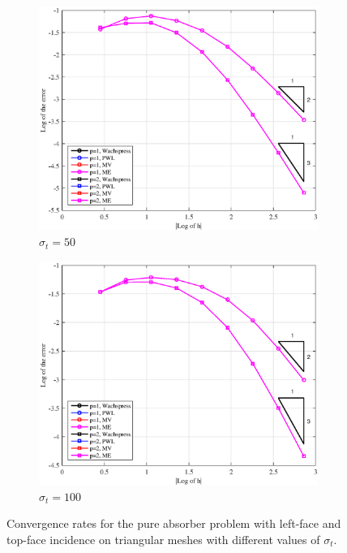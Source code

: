 \begin{figure}
{\begin{subfigure}[b]{0.485\textwidth}
	\end{subfigure}
}
\vspace{1cm}
{
	\begin{subfigure}[b]{0.485\textwidth}
		\centering
		\label{subfig::PA_LeftTop_Tri_sig50}
		\includegraphics[width=\textwidth]{figures/sec_BF/PAErr_LeftTop_Tri_sig50.eps}
	\caption{$\sigma_t = 50$}
	\end{subfigure}
	\hfill
	\begin{subfigure}[b]{0.485\textwidth}
		\centering
		\label{subfig::PA_LeftTop_Tri_sig100}
		\includegraphics[width=\textwidth]{figures/sec_BF/PAErr_LeftTop_Tri_sig100.eps}
	\caption{$\sigma_t = 100$}
	\end{subfigure}
}
\caption{Convergence rates for the pure absorber problem with left-face and top-face incidence on triangular meshes with different values of $\sigma_t$.}
\label{fig::BF_Results_PA_LeftTop_Tri}
\end{figure}

